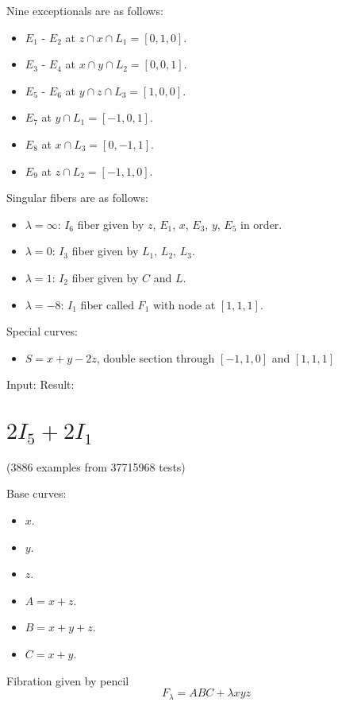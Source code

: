 \documentclass{article}
\begin{document}
Nine exceptionals are as follows:
\begin{itemize}
  \item $E_1$ - $E_2$ at $z \cap x \cap L_1 = [0,1,0]$.
  \item $E_3$ - $E_4$ at $x \cap y \cap L_2 = [0,0,1]$.
  \item $E_5$ - $E_6$ at $y \cap z \cap L_3 = [1,0,0]$.
  \item $E_7$ at $y \cap L_1 = [-1,0,1]$.
  \item $E_8$ at $x \cap L_3 = [0,-1,1]$.
  \item $E_9$ at $z \cap L_2 = [-1,1,0]$.
\end{itemize}
Singular fibers are as follows:
\begin{itemize}
  \item $\lambda = \infty$: $I_6$ fiber given by $z$, $E_1$, $x$, $E_3$, $y$, $E_5$ in order.
  \item $\lambda = 0$: $I_3$ fiber given by $L_1$, $L_2$, $L_3$.
  \item $\lambda = 1$: $I_2$ fiber given by $C$ and $L$.
  \item $\lambda = -8$: $I_1$ fiber called $F_1$ with node at $[1,1,1]$.
\end{itemize}
Special curves:
\begin{itemize}
  \item $S = x + y - 2z$, double section through $[-1,1,0]$ and $[1,1,1]$
\end{itemize}
Input:
%
Result:
%



\section{$2I_5 + 2I_1$}

(3886 examples from 37715968 tests)

Base curves:
\begin{itemize}
  \item $x$.
  \item $y$.
  \item $z$.
  \item $A = x + z$.
  \item $B = x + y + z$.
  \item $C = x+y$.
\end{itemize}
Fibration given by pencil
\[F_\lambda = ABC + \lambda xyz\]
\end{document}
